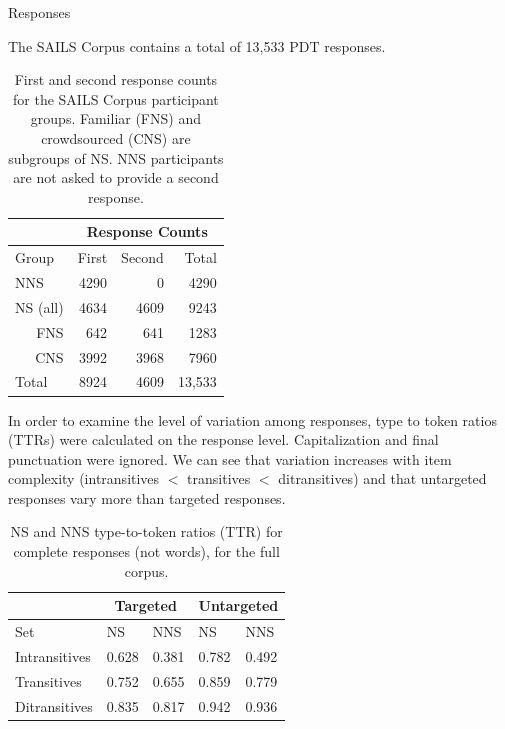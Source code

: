 \documentclass[final,t]{beamer}
\begin{document}
\begin{frame}{}
\begin{columns}[t]
\begin{column}{.33\linewidth}

\begin{block}{Responses}
\begin{center}
\begin{minipage}{.85\textwidth}

The SAILS Corpus contains a total of 13,533 PDT responses.
\begin{table}[htb!]
\begin{center}
\begin{tabular}{|l||r|r||r|}
\hline
& \multicolumn{3}{|c|}{Response Counts} \\
\hline
 Group & First & Second & Total \\
\hline
\hline
NNS & 4290 & 0 & 4290 \\
\hline
\hline
NS (all) & 4634 & 4609 & 9243 \\ %
\hline
\multicolumn{1}{|r||}{FNS} & 642 & 641 & 1283 \\ 
\hline
\multicolumn{1}{|r||}{CNS} & 3992 & 3968 & 7960 \\
\hline
\hline
Total & 8924 & 4609 & 13,533 \\
\hline
\end{tabular}
\caption{\label{tab:response-counts} First and second response counts for the SAILS Corpus participant groups. Familiar (FNS) and crowdsourced (CNS) are subgroups of NS. NNS participants are not asked to provide a second response.}
\end{center}
\end{table}

\vspace{1em}
In order to examine the level of variation among responses, type to token ratios (TTRs) were calculated on the response level. Capitalization and final punctuation were ignored. We can see that variation increases with item complexity (intransitives $<$ transitives $<$ ditransitives) and that untargeted responses vary more than targeted responses.

\begin{table}[h!]
\begin{center}
\begin{tabular}{|l||l|l||l|l|}
\hline
 & \multicolumn{2}{|c||}{Targeted} & \multicolumn{2}{|c|}{Untargeted} \\
\hline
 Set & NS & NNS & NS & NNS \\
\hline
\hline
Intransitives & 0.628 & 0.381 & 0.782 & 0.492 \\
\hline
Transitives & 0.752 & 0.655 & 0.859 & 0.779 \\ %
\hline
Ditransitives & 0.835 & 0.817 & 0.942 & 0.936 \\ 
\hline
\end{tabular}
\caption{\label{tab:ttr} NS and NNS type-to-token ratios (TTR) for complete responses (not words), for the full corpus.}
\end{center}
\end{table}


\end{minipage}
\end{center}
\end{block}
\end{column}
\end{columns}
\end{frame}
\end{document}
